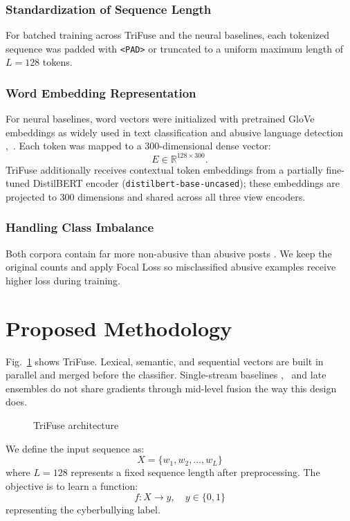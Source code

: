 \subsubsection{Standardization of Sequence Length}

For batched training across TriFuse and the neural baselines, each tokenized sequence was padded with \texttt{<PAD>} or truncated to a uniform maximum length of $L = 128$ tokens.

\subsubsection{Word Embedding Representation}

For neural baselines, word vectors were initialized with pretrained GloVe embeddings as widely used in text classification and abusive language detection \cite{ref28},~\cite{ref29}. Each token was mapped to a 300-dimensional dense vector:
\[
E \in \mathbb{R}^{128 \times 300}.
\]
TriFuse additionally receives contextual token embeddings from a partially fine-tuned DistilBERT encoder (\texttt{distilbert-base-uncased}); these embeddings are projected to 300 dimensions and shared across all three view encoders.

\subsubsection{Handling Class Imbalance}

Both corpora contain far more non-abusive than abusive posts \cite{ref12}. We keep the original counts and apply Focal Loss \cite{ref23} so misclassified abusive examples receive higher loss during training.

\section{Proposed Methodology}

Fig.~\ref{fig:architecture} shows TriFuse. Lexical, semantic, and sequential vectors are built in parallel and merged before the classifier. Single-stream baselines \cite{ref7},~\cite{ref8} and late ensembles \cite{ref14} do not share gradients through mid-level fusion the way this design does.

\begin{figure}[!t]
\centering

\caption{TriFuse architecture}
\label{fig:architecture}
\end{figure}

We define the input sequence as:
\[
X = \{ w_1, w_2, \ldots, w_L \}
\]
where $L = 128$ represents a fixed sequence length after preprocessing. The objective is to learn a function:
\begin{equation}
f: X \rightarrow y, \quad y \in \{0,1\}
\end{equation}
representing the cyberbullying label.

